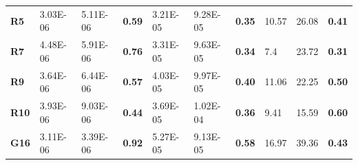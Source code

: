 \documentclass[encoding=utf8,british]{tumphthesis}
\begin{document}
\begin{table}[H]
\begin{subtable}{1\textwidth}
{\begin{tabular}{|l|llr|llr|llr|}
\rowcolor[HTML]{CFE2F3} 
\textbf{R5}                               & 3.03E-06                                             & 5.11E-06                                              & \textbf{0.59}                                    & 3.21E-05                                            & 9.28E-05                                              & \textbf{0.35}                                    & 10.57                                                & 26.08                                                 & \textbf{0.41}                                    \\
\textbf{R7}                               & 4.48E-06                                             & 5.91E-06                                              & \textbf{0.76}                                    & 3.31E-05                                             & 9.63E-05                                              & \textbf{0.34}                                    & 7.4                                                  & 23.72                                                 & \textbf{0.31}                                    \\
\rowcolor[HTML]{CFE2F3} 
\textbf{R9}                               & 3.64E-06                                             & 6.44E-06                                              & \textbf{0.57}                                    & 4.03E-05                                             & 9.97E-05                                              & \textbf{0.40}                                    & 11.06                                                & 22.25                                                 & \textbf{0.50}                                    \\
\textbf{R10}                              & 3.93E-06                                             & 9.03E-06                                              & \textbf{0.44}                                    & 3.69E-05                                             & 1.02E-04                                              & \textbf{0.36}                                    & 9.41                                                 & 15.59                                                 & \textbf{0.60}                                    \\
\rowcolor[HTML]{CFE2F3} 
\textbf{G16}                              & 3.11E-06                                             & 3.39E-06                                              & \textbf{0.92}                                    & 5.27E-05                                             & 9.13E-05                                              & \textbf{0.58}                                    & 16.97                                                & 39.36                                                 & \textbf{0.43}                                   \\ \hline

\end{tabular}}
\end{subtable}
\end{table}
\end{document}
